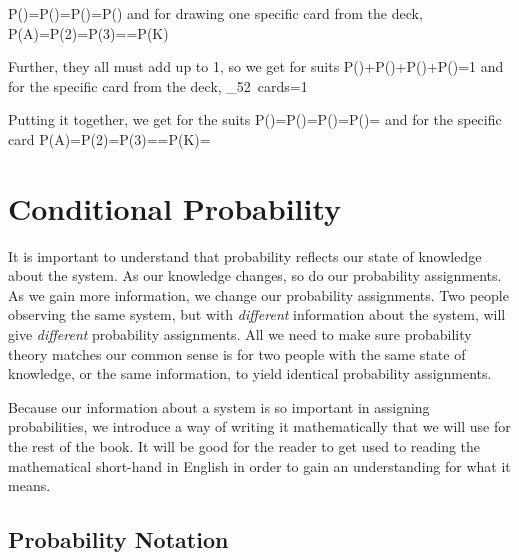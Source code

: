 \beqn
P(\spades)=P(\clubs)=P(\diamonds)=P(\hearts)
\eeqn
and for drawing one specific card from the deck,
\beqn
P(A\spades)=P(2\spades)=P(3\spades)=\cdots=P(K\hearts)
\eeqn

Further, they all must add up to 1, so we get for suits
\beqn
P(\spades)+P(\clubs)+P(\diamonds)+P(\hearts)=1
\eeqn
and for the specific card from the deck,
\beqn
{}_{\mbox{52 cards}}=1
\eeqn

Putting it together, we get for the suits
\beqn
P(\spades)=P(\clubs)=P(\diamonds)=P(\hearts)=
\eeqn
and for the specific card
\beqn
P(A\spades)=P(2\spades)=P(3\spades)=\cdots=P(K\hearts)=
\eeqn



\section{Conditional Probability}

It is important to understand that probability reflects our state of knowledge about the 
system.  As our knowledge changes, so do our probability assignments.  As we gain more 
information, we change our probability assignments.  Two people observing the same 
system, but with {\em different} information about the system, will give {\em different} 
probability assignments.  All we need to make sure probability theory matches our common 
sense is for two people with the same state of knowledge, or the same information, to yield identical probability assignments.

Because our information about a system is so important in assigning probabilities, we introduce a way of writing it mathematically that we will use for the rest of the book.  It will be good for the reader to get used to reading the mathematical short-hand in English in order to gain an understanding for what it means.  



\subsection{Probability Notation}

